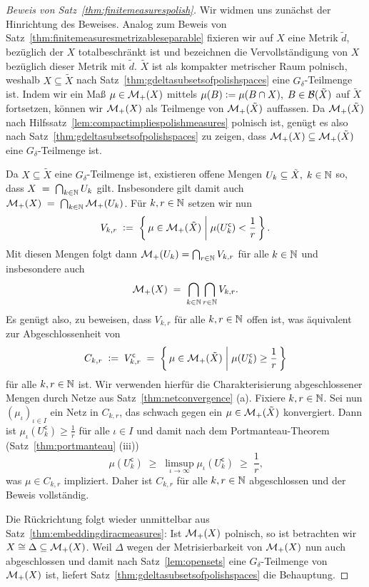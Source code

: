 \documentclass[../main/main.tex]{subfiles}
\begin{document}
	\begin{proof}[Beweis von Satz~\ref{thm:finitemeasurespolish}]
		Wir widmen uns zunächst der Hinrichtung des Beweises. Analog zum Beweis von Satz~\ref{thm:finitemeasuresmetrizableseparable} fixieren wir auf 
		$X$ eine Metrik $\tilde{d}$, bezüglich der $X$ totalbeschränkt ist und
		bezeichnen die Vervollständigung von $X$ bezüglich dieser Metrik mit $\tilde{d}$. $\tilde{X}$ ist als kompakter metrischer Raum polnisch, weshalb $X \subseteq \tilde{X}$
		nach Satz~\ref{thm:gdeltasubsetsofpolishspaces} eine $G_\delta$-Teilmenge ist. Indem wir ein Maß $\mu \in \mathcal{M}_{+}(X)$ mittels 
		$\mu(B) \vcentcolon = \mu(B \cap X), \; B \in \mathcal{B}(\tilde{X})$ auf $\tilde{X}$ fortsetzen, können wir $\mathcal{M}_{+}(X)$ als Teilmenge von $\mathcal{M}_{+}(\tilde{X})$
		auffassen. Da $\mathcal{M}_{+}(\tilde{X})$ nach 
		Hilfssatz~\ref{lem:compactimpliespolishmeasures} polnisch ist, genügt es also nach Satz~\ref{thm:gdeltasubsetsofpolishspaces} zu zeigen, 
		dass $\mathcal{M}_{+}(X) \subseteq \mathcal{M}_{+}(\tilde{X})$ eine $G_\delta$-Teilmenge ist.
		
		Da $X \subseteq \tilde{X}$ eine $G_\delta$-Teilmenge ist, existieren offene Mengen $U_k \subseteq \tilde{X}, \; k \in \mathbb{N}$ so, dass 
		$X \; = \; \bigcap_{k \in \mathbb{N}} U_k$
		gilt. Insbesondere gilt damit auch
		$\mathcal{M}_{+}(X) \; = \; \bigcap_{k \in \mathbb{N}} \mathcal{M}_{+}(U_k)$.
		Für $k, r \in \mathbb{N}$ setzen wir nun
		\[ V_{k, r} \; \vcentcolon = \; \left\{\, \mu \in \mathcal{M}_{+}(\tilde{X}) \; \middle| \; \mu(U_k^{\mathsf{c}}) < \frac{1}{r} \,\right\} \text{.} \]
		Mit diesen Mengen folgt dann $\mathcal{M}_{+}(U_k) = \bigcap_{r \in \mathbb{N}} V_{k, r}$ für alle $k \in \mathbb{N}$ und insbesondere auch
		\[ \mathcal{M}_{+}(X) \; = \; \bigcap_{k \in \mathbb{N}} \bigcap_{r \in \mathbb{N}} V_{k, r} \text{.} \]
		Es genügt also, zu beweisen, dass $V_{k, r}$ für alle $k, r \in \mathbb{N}$ offen ist, was äquivalent zur Abgeschlossenheit von 
		\[C_{k, r} \; \vcentcolon = \; V_{k, r}^{\mathsf{c}} \; = \; \left\{\, \mu \in \mathcal{M}_{+}(\tilde{X}) \; \middle| \; \mu(U_k^{\mathsf{c}}) \geq \frac{1}{r} \,\right\} \] 
		für alle $k, r \in \mathbb{N}$ ist. Wir verwenden hierfür die Charakterisierung abgeschlossener Mengen durch Netze aus Satz~\ref{thm:netconvergence} (a).
		Fixiere $k, r \in \mathbb{N}$. Sei nun $(\mu_\iota)_{\iota \in I}$ ein Netz in $C_{k, r}$, das schwach gegen ein $\mu \in \mathcal{M}_{+}(\tilde{X})$ konvergiert.
		Dann ist $\mu_\iota(U_k^{\mathsf{c}}) \geq \frac{1}{r}$ für alle $\iota \in I$ und damit nach dem Portmanteau-Theorem (Satz~\ref{thm:portmanteau} (iii))
		\[ \mu(U_k^{\mathsf{c}}) \; \geq \; \limsup_{\iota \to \infty} \mu_\iota(U_k^{\mathsf{c}}) \; \geq \; \frac{1}{r} \text{,} \]
		was $\mu \in C_{k, r}$ impliziert. Daher ist $C_{k, r}$ für alle $k, r \in \mathbb{N}$ abgeschlossen und der Beweis vollständig.
		
		Die Rückrichtung folgt wieder unmittelbar aus Satz~\ref{thm:embeddingdiracmeasures}: Ist $\mathcal{M}_{+}(X)$ polnisch, 
		so ist betrachten wir $X \cong \Delta \subseteq \mathcal{M}_{+}(X)$. Weil $\Delta$ wegen der Metrisierbarkeit von $\mathcal{M}_{+}(X)$ nun auch abgeschlossen und damit nach 
		Satz~\ref{lem:opensets} eine $G_\delta$-Teilmenge von $\mathcal{M}_{+}(X)$ ist, liefert Satz~\ref{thm:gdeltasubsetsofpolishspaces} die Behauptung.
	\end{proof}
\end{document}
